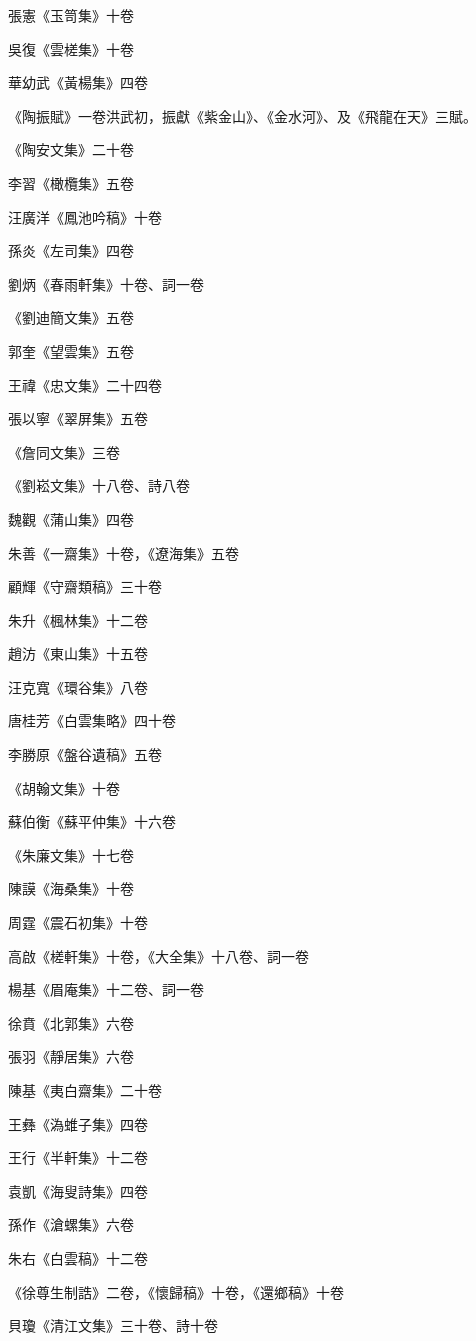 張憲《玉笥集》十卷

吳復《雲槎集》十卷

華幼武《黃楊集》四卷

《陶振賦》一卷洪武初，振獻《紫金山》、《金水河》、及《飛龍在天》三賦。

《陶安文集》二十卷

李習《橄欖集》五卷

汪廣洋《鳳池吟稿》十卷

孫炎《左司集》四卷

劉炳《春雨軒集》十卷、詞一卷

《劉迪簡文集》五卷

郭奎《望雲集》五卷

王禕《忠文集》二十四卷

張以寧《翠屏集》五卷

《詹同文集》三卷

《劉崧文集》十八卷、詩八卷

魏觀《蒲山集》四卷

朱善《一齋集》十卷，《遼海集》五卷

顧輝《守齋類稿》三十卷

朱升《楓林集》十二卷

趙汸《東山集》十五卷

汪克寬《環谷集》八卷

唐桂芳《白雲集略》四十卷

李勝原《盤谷遺稿》五卷

《胡翰文集》十卷

蘇伯衡《蘇平仲集》十六卷

《朱廉文集》十七卷

陳謨《海桑集》十卷

周霆《震石初集》十卷

高啟《槎軒集》十卷，《大全集》十八卷、詞一卷

楊基《眉庵集》十二卷、詞一卷

徐賁《北郭集》六卷

張羽《靜居集》六卷

陳基《夷白齋集》二十卷

王彝《溈蜼子集》四卷

王行《半軒集》十二卷

袁凱《海叟詩集》四卷

孫作《滄螺集》六卷

朱右《白雲稿》十二卷

《徐尊生制誥》二卷，《懷歸稿》十卷，《還鄉稿》十卷

貝瓊《清江文集》三十卷、詩十卷

